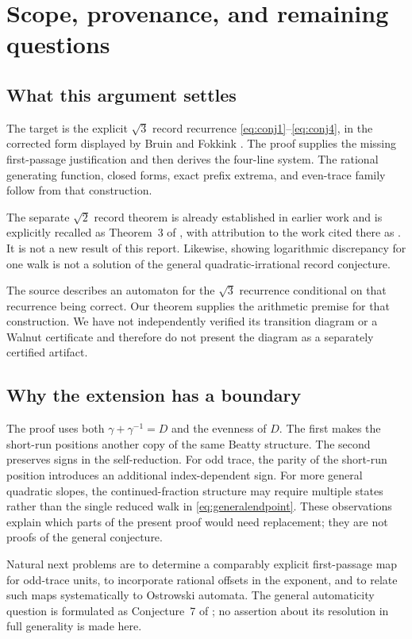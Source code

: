 \documentclass[11pt]{article}
\theoremstyle{definition}
\numberwithin{equation}{section}
\begin{document}
\section{Scope, provenance, and remaining questions}\label{sec:scope}
\subsection{What this argument settles}
The target is the explicit $\sqrt3$ record recurrence \eqref{eq:conj1}--\eqref{eq:conj4}, in the corrected form displayed by Bruin and Fokkink \cite[p.~7]{BF}. The proof supplies the missing first-passage justification and then derives the four-line system. The rational generating function, closed forms, exact prefix extrema, and even-trace family follow from that construction.

The separate $\sqrt2$ record theorem is already established in earlier work and is explicitly recalled as Theorem~3 of \cite{BF}, with attribution to the work cited there as \cite{FFL}. It is not a new result of this report. Likewise, showing logarithmic discrepancy for one walk is not a solution of the general quadratic-irrational record conjecture.

The source \cite{BF} describes an automaton for the $\sqrt3$ recurrence conditional on that recurrence being correct. Our theorem supplies the arithmetic premise for that construction. We have not independently verified its transition diagram or a Walnut certificate and therefore do not present the diagram as a separately certified artifact.

\subsection{Why the extension has a boundary}
The proof uses both $\gamma+\gamma^{-1}=D$ and the evenness of $D$. The first makes the short-run positions another copy of the same Beatty structure. The second preserves signs in the self-reduction. For odd trace, the parity of the short-run position introduces an additional index-dependent sign. For more general quadratic slopes, the continued-fraction structure may require multiple states rather than the single reduced walk in \eqref{eq:generalendpoint}. These observations explain which parts of the present proof would need replacement; they are not proofs of the general conjecture.

Natural next problems are to determine a comparably explicit first-passage map for odd-trace units, to incorporate rational offsets in the exponent, and to relate such maps systematically to Ostrowski automata. The general automaticity question is formulated as Conjecture~7 of \cite{BF}; no assertion about its resolution in full generality is made here.
\end{document}
